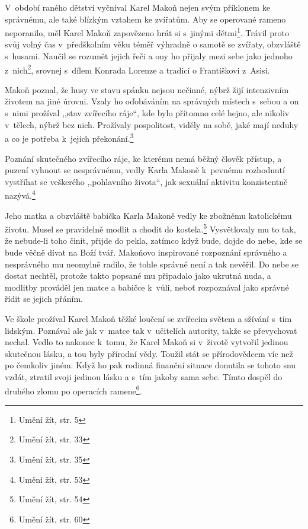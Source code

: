 V~období raného dětství vyčníval Karel Makoň nejen svým příklonem ke správnému, ale
také blízkým vztahem ke zvířatům. Aby se operované rameno neporanilo, měl
Karel Makoň zapovězeno hrát si s~jinými dětmi\footnote{Umění žít, str. 5}. Trávil proto svůj volný čas
v~předškolním věku téměř výhradně o samotě se zvířaty, obzvláště s~husami.
Naučil se rozumět jejich řeči a ony ho přijaly mezi sebe jako jednoho
z~nich\footnote{Umění žít, str. 33}, srovnej s~dílem Konrada
Lorenze\cite{lorenz1949redete} a tradicí o Františkovi z~Asisi\cite{thompson2012francis}.

Makoň poznal, že husy ve stavu spánku nejsou nečinné, nýbrž žijí intenzivním
životem na jiné úrovni. Vzaly ho oďobáváním na správných místech s~sebou a on
s~nimi prožíval ,,stav zvířecího ráje``, kde bylo přítomno celé hejno, ale
nikoliv v~tělech, nýbrž bez nich. Prožívaly pospolitost, viděly na sobě, jaké
mají neduhy a co je potřeba k~jejich překonání.\footnote{Umění žít, str. 35}

Poznání skutečného zvířecího ráje, ke kterému nemá běžný člověk přístup, a
puzení vyhnout se nesprávnému, vedly Karla Makoně k~pevnému rozhodnutí vystříhat
se veškerého ,,pohlavního života``, jak sexuální aktivitu konzistentně
nazývá.\footnote{Umění žít, str. 53}

Jeho matka a obzvláště babička Karla Makoně vedly ke zbožnému katolickému
životu. Musel se pravidelně modlit a chodit do kostela.\footnote{Umění žít, str.
54} Vysvětlovaly mu to tak,
že nebude-li toho činit, přijde do pekla, zatímco když bude, dojde do nebe, kde
se bude věčně dívat na Boží tvář. Makoňovo inspirované rozpoznání správného a
nesprávného mu neomylně radilo, že tohle správné není a tak nevěřil. Do nebe se
dostat nechtěl, protože takto popsané mu připadalo jako ukrutná nuda, a modlitby
prováděl jen matce a babičce k~vůli, neboť rozpoznával jako správné řídit se
jejich přáním.

Ve škole prožíval Karel Makoň těžké loučení se zvířecím světem a sžívání s~tím
lidským. Poznával ale jak v~matce tak v~učitelích autority, takže se převychovat
nechal. Vedlo to nakonec k~tomu, že Karel Makoň si v~životě vytvořil jedinou
skutečnou lásku, a tou byly přírodní vědy. Toužil stát se přírodovědcem víc než
po čemkoliv jiném. Když ho pak rodinná finanční situace donutila se tohoto snu
vzdát, ztratil svoji jedinou lásku a s~tím jakoby sama sebe.
Tímto dospěl do druhého zlomu po operacích ramene\footnote{Umění žít, str. 60}.

